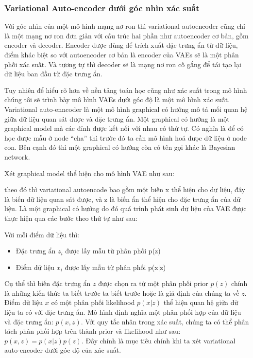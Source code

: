         \subsubsection{Variational Auto-encoder dưới góc nhìn xác suất}
        Với góc nhìn của một mô hình mạng nơ-ron thì variational autoencoder cũng chỉ là một mạng nơ ron đơn giản với cấu trúc hai phần như autoencoder cơ bản, gồm encoder và decoder. 
        Encoder được dùng để trích xuất đặc trưng ẩn từ dữ liệu, điểm khác biệt so với autoencoder cơ bản là encoder của VAEs sẽ là một phân phối xác suất.
        Và tương tự thì decoder sẽ là mạng nơ ron cố gắng để tái tạo lại dữ liệu ban đầu từ đặc trưng ẩn.

        Tuy nhiên để hiểu rõ hơn về nền tảng toán học cũng như xác suất trong mô hình chúng tôi sẽ trình bày mô hình VAEs dưới góc độ là một mô hình xác suất.
        Variational auto-enncoder là một mô hình graphical có hướng mô tả mối quan hệ giữa dữ liệu quan sát được và đặc trưng ẩn. Một graphical có hướng là một graphical model mà các đỉnh được kết nối với nhau có thứ tự. Có nghĩa là để có học được mẫu ở node ``cha'' thì trước đó ta cần mô hình hoá đưọc dữ liệu ở node con. Bên cạnh đó thì một graphical có hướng còn có tên gọi khác là Bayesian network.

        Xét graphical model thể hiện cho mô hình VAE như sau:

        theo đó thì variational autoencode bao gồm một biến x thể hiện cho dữ liệu, đây là biến dữ liệu quan sát được, và z là biến ẩn thể hiện cho đặc trưng ẩn của dữ liệu. 
        Là một graphical có hướng do đó quá trình phát sinh dữ liệu của VAE được thực hiện qua các bước theo thứ tự như sau: 
        
        Với mỗi điểm dữ liệu thì: 
        \begin{itemize}
            \item Đặc trưng ẩn $z_i$ được lấy mẫu từ phân phối p(z)
            \item Điểm dữ liệu $x_i$ được lấy mẫu từ phân phối p(x|z)
        \end{itemize}

        Cụ thể thì biến đặc trưng ẩn $z$ được chọn ra từ một phân phối prior $p(z)$ chính là những kiến thức ta biết trước ta biết trước hoặc là giả định của chúng ta về $z$. Điểm dữ liệu $x$ có một phân phối likelihood $p(x|z)$ thể hiện quan hệ giữa dữ liệu ta có với đặc trưng ẩn.
        Mô hình định nghĩa một phân phối hợp của dữ liệu và đặc trưng ẩn: $p(x,z)$. 
        Với quy tắc nhân trong xác suất, chúng ta có thể phân tách phân phối hợp trên thành prior và likelihood như sau: $p(x,z) = p(x|z)p(z)$. Đây chính là mục tiêu chính khi ta xét variational auto-encoder dưới góc độ của xác suất.


